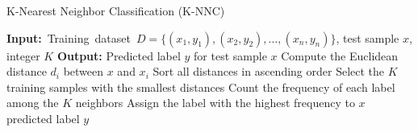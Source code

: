 \documentclass[conference]{IEEEtran}
\begin{document}
\begin{algorithm}
\caption{K-Nearest Neighbor Classification (K-NNC)}
\begin{algorithmic}[1]
    \STATE \mbox{\textbf{Input:} Training dataset $D = \{(x_1, y_1), (x_2, y_2), \dots, (x_n, y_n)\}$}, test sample $x$, integer $K$
    \STATE \textbf{Output:} Predicted label $y$ for test sample $x$
        \STATE Compute the Euclidean distance $d_i$ between $x$ and $x_i$
    \ENDFOR
    \STATE Sort all distances in ascending order
    \STATE Select the $K$ training samples with the smallest distances
    \STATE Count the frequency of each label among the $K$ neighbors
    \STATE Assign the label with the highest frequency to $x$
    \RETURN predicted label $y$
\end{algorithmic}
\end{algorithm}
\end{document}
